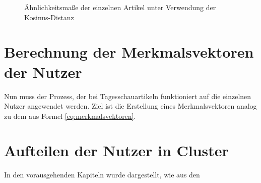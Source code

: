 \begin{figure}
	\centering



	\caption{Ähnlichkeitsmaße der einzelnen Artikel unter Verwendung der Kosinus-Distanz}
	\label{fig:textvergleich}
\end{figure}

\section{Berechnung der Merkmalsvektoren der Nutzer}
Nun muss der Prozess, der bei Tagesschauartikeln funktioniert auf die einzelnen Nutzer angewendet werden. Ziel ist die Erstellung eines Merkmalsvektoren analog zu dem aus Formel \ref{eq:merkmalsvektoren}. 


\section{Aufteilen der Nutzer in Cluster}
In den vorausgehenden Kapiteln wurde dargestellt, wie aus den 


 

